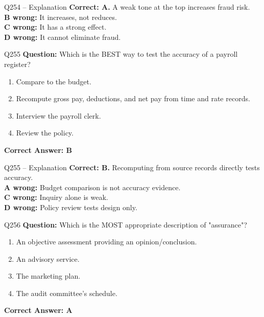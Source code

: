 \documentclass[aspectratio=169,10pt]{beamer}
\begin{document}
	\begin{frame}[t]{Q254 -- Explanation}
		\small
		\textbf{Correct: A.} A weak tone at the top increases fraud risk. \\[4pt]
		\textbf{B wrong:} It increases, not reduces. \\[2pt]
		\textbf{C wrong:} It has a strong effect. \\[2pt]
		\textbf{D wrong:} It cannot eliminate fraud.
	\end{frame}
	
	\begin{frame}[t]{Q255}
		\small
		\textbf{Question:} Which is the BEST way to test the accuracy of a payroll register?
		\begin{enumerate}[label=\Alph*.,itemsep=1pt,topsep=2pt]
			\item Compare to the budget.
			\item Recompute gross pay, deductions, and net pay from time and rate records.
			\item Interview the payroll clerk.
			\item Review the policy.
		\end{enumerate}
		\vspace{4pt}
		\textbf{Correct Answer: B}
	\end{frame}
	
	\begin{frame}[t]{Q255 -- Explanation}
		\small
		\textbf{Correct: B.} Recomputing from source records directly tests accuracy. \\[4pt]
		\textbf{A wrong:} Budget comparison is not accuracy evidence. \\[2pt]
		\textbf{C wrong:} Inquiry alone is weak. \\[2pt]
		\textbf{D wrong:} Policy review tests design only.
	\end{frame}
	
	\begin{frame}[t]{Q256}
		\small
		\textbf{Question:} Which is the MOST appropriate description of "assurance"?
		\begin{enumerate}[label=\Alph*.,itemsep=1pt,topsep=2pt]
			\item An objective assessment providing an opinion/conclusion.
			\item An advisory service.
			\item The marketing plan.
			\item The audit committee's schedule.
		\end{enumerate}
		\vspace{4pt}
		\textbf{Correct Answer: A}
	\end{frame}
	
\end{document}
